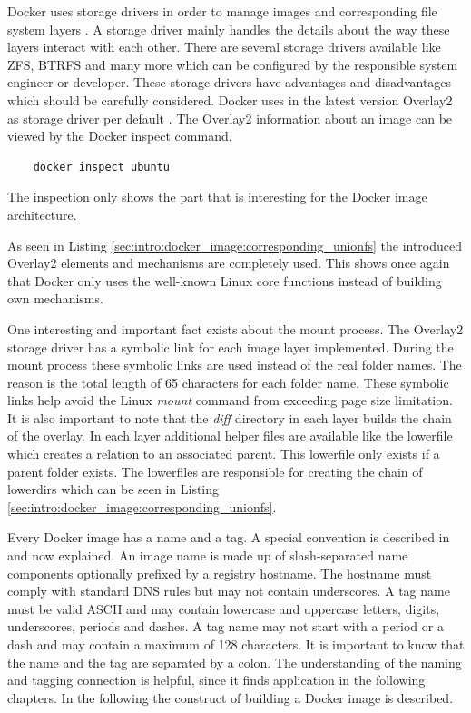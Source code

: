 Docker uses storage drivers in order to manage images and corresponding file system layers \cite{docker_storage_driver}. 
A storage driver mainly handles the details about the way these layers interact with each other.
There are several storage drivers available like ZFS, BTRFS and many more which can be configured by the responsible system engineer or developer. 
These storage drivers have advantages and disadvantages which should be carefully considered. 
Docker uses in the latest version Overlay2 as storage driver per default \cite{docker_storage_driver}. 
The Overlay2 information about an image can be viewed by the Docker inspect command.
\begin{lstlisting}
	docker inspect ubuntu
\end{lstlisting}
The inspection only shows the part that is interesting for the Docker image architecture.

As seen in Listing \ref{sec:intro:docker_image:corresponding_unionfs} the introduced Overlay2 elements and mechanisms are completely used.
This shows once again that Docker only uses the well-known Linux core functions instead of building own mechanisms.

One interesting and important fact exists about the mount process.
The Overlay2 storage driver has a symbolic link for each image layer implemented. 
During the mount process these symbolic links are used instead of the real folder names. 
The reason is the total length of 65 characters for each folder name. 
These symbolic links help avoid the Linux \textit{mount} command from exceeding page size limitation.
It is also important to note that the \textit{diff} directory in each layer builds the chain of the overlay. 
In each layer additional helper files are available like the lowerfile which creates a relation to an associated parent. 
This lowerfile only exists if a parent folder exists. 
The lowerfiles are responsible for creating the chain of lowerdirs which can be seen in Listing \ref{sec:intro:docker_image:corresponding_unionfs}.

Every Docker image has a name and a tag. A special convention is described in \cite{docker_tag} and now explained. 
An image name is made up of slash-separated name components optionally prefixed by a registry hostname. 
The hostname must comply with standard DNS rules but may not contain underscores. 
A tag name must be valid ASCII and may contain lowercase and uppercase letters, digits, underscores, periods and dashes. 
A tag name may not start with a period or a dash and may contain a maximum of 128 characters.
It is important to know that the name and the tag are separated by a colon.
The understanding of the naming and tagging connection is helpful, since it finds application in the following chapters.
In the following the construct of building a Docker image is described.

